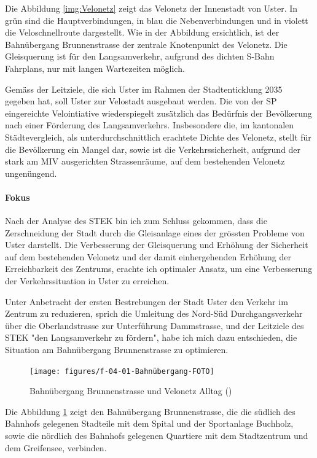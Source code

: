 Die Abbildung \ref{img:Velonetz} zeigt das Velonetz der Innenstadt von Uster. In grün sind die Hauptverbindungen, in blau die Nebenverbindungen und in violett die Veloschnellroute dargestellt. Wie in der Abbildung ersichtlich, ist der Bahnübergang Brunnenstrasse der zentrale Knotenpunkt des Velonetz. Die Gleisquerung ist für den Langsamverkehr, aufgrund des dichten S-Bahn Fahrplans, nur mit langen Wartezeiten möglich. 

Gemäss der Leitziele, die sich Uster im Rahmen der Stadtenticklung 2035 gegeben hat, soll Uster zur Velostadt ausgebaut werden. Die von der SP eingereichte Velointiative wiederspiegelt zusätzlich das Bedürfnis der Bevölkerung nach einer Förderung des Langsamverkehrs. Insbesondere die, im kantonalen Städtevergleich, als unterdurchschnittlich erachtete Dichte des Velonetz, stellt für die Bevölkerung ein Mangel dar, sowie ist die Verkehrssicherheit, aufgrund der stark am MIV ausgerichten Strassenräume, auf dem bestehenden Velonetz ungenüngend. \\

\paragraph{Fokus} 

Nach der Analyse des STEK bin ich zum Schluss gekommen, dass die Zerschneidung der Stadt durch die Gleisanlage eines der grössten Probleme von Uster darstellt. Die Verbesserung der Gleisquerung und Erhöhung der Sicherheit auf dem bestehenden Velonetz und der damit einhergehenden Erhöhung der Erreichbarkeit des Zentrums, erachte ich optimaler Ansatz, um eine Verbesserung der Verkehrssituation in Uster zu erreichen. 

Unter Anbetracht der ersten Bestrebungen der Stadt Uster den Verkehr im Zentrum zu reduzieren, sprich die Umleitung des Nord-Süd Durchgangsverkehr über die Oberlandstrasse zur Unterführung Dammstrasse, und der Leitziele des STEK "den Langsamverkehr zu fördern", habe ich mich dazu entschieden, die Situation am Bahnübergang Brunnenstrasse zu optimieren.


\begin{figure}[h!]
	\centering
	\texttt{[image: figures/f-04-01-Bahnübergang-FOTO]}
	\caption[Bahnübergang Brunnenstrasse]{Bahnübergang Brunnenstrasse und Velonetz Alltag (\cite{GIS})}
	\label{img:Brunnenstrasse}
\end{figure}

Die Abbildung \ref{img:Brunnenstrasse} zeigt den Bahnübergang Brunnenstrasse, die die südlich des Bahnhofs gelegenen Stadteile mit dem Spital und der Sportanlage Buchholz, sowie die nördlich des Bahnhofs gelegenen Quartiere mit dem Stadtzentrum und dem Greifensee, verbinden. 

